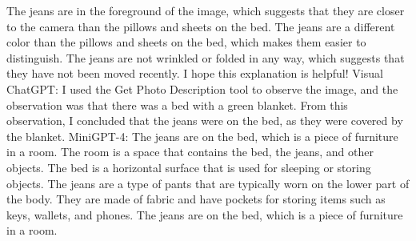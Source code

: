\begin{enumerate}
    The jeans are in the foreground of the image, which suggests that they are closer to the camera than the pillows and sheets on the bed.
    The jeans are a different color than the pillows and sheets on the bed, which makes them easier to distinguish.
    The jeans are not wrinkled or folded in any way, which suggests that they have not been moved recently.
    I hope this explanation is helpful!
    \subitem Visual ChatGPT: I used the Get Photo Description tool to observe the image, and the observation was that there was a bed with a green blanket. From this observation, I concluded that the jeans were on the bed, as they were covered by the blanket.
    \subitem MiniGPT-4: The jeans are on the bed, which is a piece of furniture in a room. The room is a space that contains the bed, the jeans, and other objects. The bed is a horizontal surface that is used for sleeping or storing objects. The jeans are a type of pants that are typically worn on the lower part of the body. They are made of fabric and have pockets for storing items such as keys, wallets, and phones. The jeans are on the bed, which is a piece of furniture in a room.
\end{enumerate}
